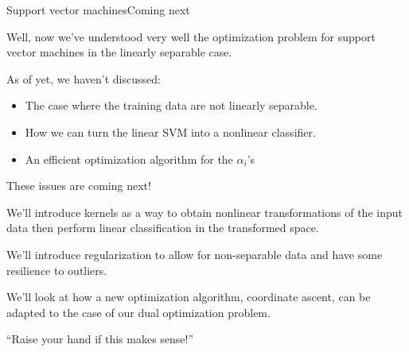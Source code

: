 \documentclass{beamer}
\begin{document}
\begin{frame}{Support vector machines}{Coming next}

  Well, now we've understood very well the optimization problem for
  support vector machines in the linearly separable case.

  \medskip

  As of yet, we haven't discussed:
  \begin{itemize}
  \item The case where the training data are \alert{not
    linearly separable}.
  \item How we can turn the linear SVM into a \alert{nonlinear} classifier.
  \item An \alert{efficient optimization algorithm} for the $\alpha_i$'s
  \end{itemize}

  These issues are coming next!

  \medskip

  We'll introduce \alert{kernels} as a way to obtain nonlinear
  transformations of the input data then perform linear classification
  in the transformed space.

  \medskip

  We'll introduce \alert{regularization} to allow for non-separable
  data and have some resilience to outliers.

  \medskip

  We'll look at how a new optimization algorithm, \alert{coordinate
    ascent}, can be adapted to the case of our dual optimization
  problem.

  \medskip
  
  ``Raise your hand if this makes sense!''

\end{frame}
\end{document}

